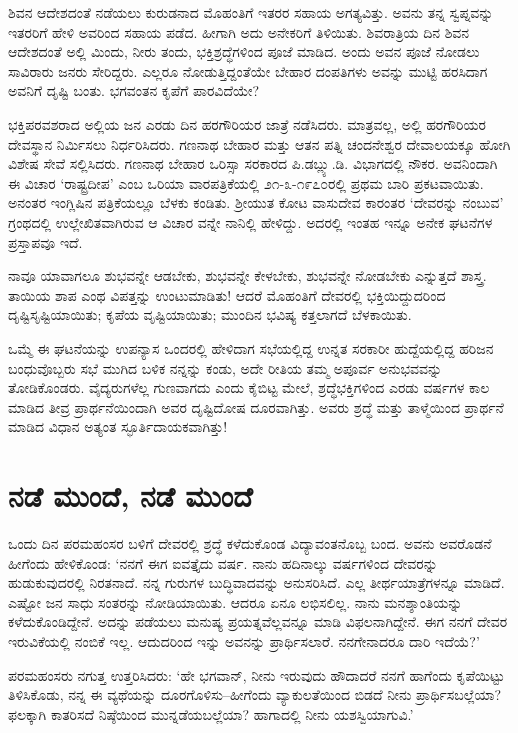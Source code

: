ಶಿವನ ಆದೇಶದಂತೆ ನಡೆಯಲು ಕುರುಡನಾದ ಮೊಹಂತಿಗೆ ಇತರರ ಸಹಾಯ ಅಗತ್ಯವಿತ್ತು. ಅವನು ತನ್ನ ಸ್ವಪ್ನವನ್ನು ಇತರರಿಗೆ ಹೇಳಿ ಅವರಿಂದ ಸಹಾಯ ಪಡೆದ. ಹೀಗಾಗಿ ಅದು ಅನೇಕರಿಗೆ ತಿಳಿಯಿತು. ಶಿವರಾತ್ರಿಯ ದಿನ ಶಿವನ ಆದೇಶದಂತೆ ಅಲ್ಲಿ ಮಿಂದು, ನೀರು ತಂದು, ಭಕ್ತಿಶ್ರದ್ಧೆಗಳಿಂದ ಪೂಜೆ ಮಾಡಿದ. ಅಂದು ಅವನ ಪೂಜೆ ನೋಡಲು ಸಾವಿರಾರು ಜನರು ಸೇರಿದ್ದರು. ಎಲ್ಲರೂ ನೋಡುತ್ತಿದ್ದಂತೆಯೇ ಬೇಹಾರ ದಂಪತಿಗಳು ಅವನ್ನು ಮುಟ್ಟಿ ಹರಸಿದಾಗ ಅವನಿಗೆ ದೃಷ್ಟಿ ಬಂತು. ಭಗವಂತನ ಕೃಪೆಗೆ ಪಾರವಿದೆಯೇ?

ಭಕ್ತಿಪರವಶರಾದ ಅಲ್ಲಿಯ ಜನ ಎರಡು ದಿನ ಹರಗೌರಿಯರ ಜಾತ್ರೆ ನಡೆಸಿದರು. ಮಾತ್ರವಲ್ಲ, ಅಲ್ಲಿ ಹರಗೌರಿಯರ ದೇವಸ್ಥಾನ ನಿರ್ಮಿಸಲು ನಿರ್ಧರಿಸಿದರು. ಗಣನಾಥ ಬೇಹಾರ ಮತ್ತು ಆತನ ಪತ್ನಿ ಚಂದನೇಶ್ವರ ದೇವಾಲಯಕ್ಕೂ ಹೋಗಿ ವಿಶೇಷ ಸೇವೆ ಸಲ್ಲಿಸಿದರು. ಗಣನಾಥ ಬೇಹಾರ ಒರಿಸ್ಸಾ ಸರಕಾರದ ಪಿ.ಡಬ್ಲ್ಯು.ಡಿ. ವಿಭಾಗದಲ್ಲಿ ನೌಕರ. ಅವನಿಂದಾಗಿ ಈ ವಿಚಾರ ‘ರಾಷ್ಟ್ರದೀಪ’ ಎಂಬ ಒರಿಯಾ ವಾರಪತ್ರಿಕೆಯಲ್ಲಿ ೨೧-೩-೧೯೭೦ರಲ್ಲಿ ಪ್ರಥಮ ಬಾರಿ ಪ್ರಕಟವಾಯಿತು. ಅನಂತರ ಇಂಗ್ಲಿಷಿನ  ಪತ್ರಿಕೆಯಲ್ಲೂ ಬೆಳಕು ಕಂಡಿತು. ಶ‍್ರೀಯುತ ಕೋಟ ವಾಸುದೇವ ಕಾರಂತರ ‘ದೇವರನ್ನು ನಂಬುವ’ ಗ್ರಂಥದಲ್ಲಿ ಉಲ್ಲೇಖಿತವಾಗಿರುವ ಆ ವಿಚಾರ ವನ್ನೇ ನಾನಿಲ್ಲಿ ಹೇಳಿದ್ದು. ಅದರಲ್ಲಿ ಇಂತಹ ಇನ್ನೂ ಅನೇಕ ಘಟನೆಗಳ ಪ್ರಸ್ತಾಪವೂ ಇದೆ.

ನಾವೂ ಯಾವಾಗಲೂ ಶುಭವನ್ನೇ ಆಡಬೇಕು, ಶುಭವನ್ನೇ ಕೇಳಬೇಕು, ಶುಭವನ್ನೇ ನೋಡಬೇಕು ಎನ್ನುತ್ತದೆ ಶಾಸ್ತ್ರ. ತಾಯಿಯ ಶಾಪ ಎಂಥ ವಿಪತ್ತನ್ನು ಉಂಟುಮಾಡಿತು! ಆದರೆ ಮೊಹಂತಿಗೆ ದೇವರಲ್ಲಿ ಭಕ್ತಿಯಿದ್ದುದರಿಂದ ದೃಷ್ಟಿಸೃಷ್ಟಿಯಾಯಿತು; ಕೃಪೆಯ ವೃಷ್ಟಿಯಾಯಿತು; ಮುಂದಿನ ಭವಿಷ್ಯ ಕತ್ತಲಾಗದೆ ಬೆಳಕಾಯಿತು.

ಒಮ್ಮೆ ಈ ಘಟನೆಯನ್ನು ಉಪನ್ಯಾಸ ಒಂದರಲ್ಲಿ ಹೇಳಿದಾಗ ಸಭೆಯಲ್ಲಿದ್ದ ಉನ್ನತ ಸರಕಾರೀ ಹುದ್ದೆಯಲ್ಲಿದ್ದ ಹರಿಜನ ಬಂಧುವೊಬ್ಬರು ಸಭೆ ಮುಗಿದ ಬಳಿಕ ನನ್ನನ್ನು ಕಂಡು, ಅದೇ ರೀತಿಯ ತಮ್ಮ ಅಪೂರ್ವ ಅನುಭವವನ್ನು ತೋಡಿಕೊಂಡರು. ವೈದ್ಯರುಗಳೆಲ್ಲ ಗುಣವಾಗದು ಎಂದು ಕೈಬಿಟ್ಟ ಮೇಲೆ, ಶ್ರದ್ಧೆಭಕ್ತಿಗಳಿಂದ ಎರಡು ವರ್ಷಗಳ ಕಾಲ ಮಾಡಿದ ತೀವ್ರ ಪ್ರಾರ್ಥನೆಯಿಂದಾಗಿ ಅವರ ದೃಷ್ಟಿದೋಷ ದೂರವಾಗಿತ್ತು. ಅವರು ಶ್ರದ್ಧೆ ಮತ್ತು ತಾಳ್ಮೆಯಿಂದ ಪ್ರಾರ್ಥನೆ ಮಾಡಿದ ವಿಧಾನ ಅತ್ಯಂತ ಸ್ಫೂರ್ತಿದಾಯಕವಾಗಿತ್ತು!


\section{ನಡೆ ಮುಂದೆ, ನಡೆ ಮುಂದೆ}

ಒಂದು ದಿನ ಪರಮಹಂಸರ ಬಳಿಗೆ ದೇವರಲ್ಲಿ ಶ್ರದ್ಧೆ ಕಳೆದುಕೊಂಡ ವಿದ್ಯಾವಂತನೊಬ್ಬ ಬಂದ. ಅವನು ಅವರೊಡನೆ ಹೀಗೆಂದು ಹೇಳಿಕೊಂಡ: ‘ನನಗೆ ಈಗ ಐವತ್ತೈದು ವರ್ಷ. ನಾನು ಹದಿನಾಲ್ಕು ವರ್ಷಗಳಿಂದ ದೇವರನ್ನು ಹುಡುಕುವುದರಲ್ಲಿ ನಿರತನಾದೆ. ನನ್ನ ಗುರುಗಳ ಬುದ್ಧಿವಾದವನ್ನು ಅನುಸರಿಸಿದೆ. ಎಲ್ಲ ತೀರ್ಥಯಾತ್ರೆಗಳನ್ನೂ ಮಾಡಿದೆ. ಎಷ್ಟೋ ಜನ ಸಾಧು ಸಂತರನ್ನು ನೋಡಿಯಾಯಿತು. ಆದರೂ ಏನೂ ಲಭಿಸಲಿಲ್ಲ. ನಾನು ಮನಶ್ಶಾಂತಿಯನ್ನು ಕಳೆದುಕೊಂಡಿದ್ದೇನೆ. ಅದನ್ನು ಪಡೆಯಲು ಮನುಷ್ಯ ಪ್ರಯತ್ನವೆಲ್ಲವನ್ನೂ ಮಾಡಿ ವಿಫಲನಾಗಿದ್ದೇನೆ. ಈಗ ನನಗೆ ದೇವರ ಇರುವಿಕೆಯಲ್ಲಿ ನಂಬಿಕೆ ಇಲ್ಲ. ಆದುದರಿಂದ ಇನ್ನು ಅವನನ್ನು ಪ್ರಾರ್ಥಿಸಲಾರೆ. ನನಗೇನಾದರೂ ದಾರಿ ಇದೆಯೆ?’

ಪರಮಹಂಸರು ನಗುತ್ತ ಉತ್ತರಿಸಿದರು: ‘ಹೇ ಭಗವಾನ್, ನೀನು ಇರುವುದು ಹೌದಾದರೆ ನನಗೆ ಹಾಗೆಂದು ಕೃಪೆಯಿಟ್ಟು ತಿಳಿಸಿಕೊಡು, ನನ್ನ ಈ ವ್ಯಥೆಯನ್ನು ದೂರಗೊಳಿಸು–ಹೀಗೆಂದು ವ್ಯಾಕುಲತೆಯಿಂದ ಬಿಡದೆ ನೀನು ಪ್ರಾರ್ಥಿಸಬಲ್ಲೆಯಾ? ಫಲಕ್ಕಾಗಿ ಕಾತರಿಸದೆ ನಿಷ್ಠೆಯಿಂದ ಮುನ್ನಡೆಯಬಲ್ಲೆಯಾ? ಹಾಗಾದಲ್ಲಿ ನೀನು ಯಶಸ್ವಿಯಾಗುವಿ.’

